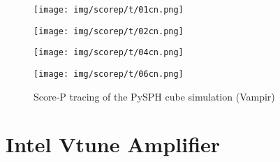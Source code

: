 \documentclass[a4paper,pagesize,12pt]{scrbook}
\begin{document}
\begin{figure}[ht]
\centering
\caption{Score-P tracing of the PySPH cube simulation (Vampir)}
\label{scorepTV}
\begin{minipage}[c]{\textwidth}
\captionsetup{labelformat=empty} \centering
    \texttt{[image: img/scorep/t/01cn.png]}
\end{minipage}
\noindent
\begin{minipage}[c]{\textwidth}
\captionsetup{labelformat=empty} \centering
    \texttt{[image: img/scorep/t/02cn.png]}
\end{minipage}
\noindent
\begin{minipage}[c]{\textwidth}
\captionsetup{labelformat=empty} \centering
    \texttt{[image: img/scorep/t/04cn.png]}
\end{minipage}
\noindent
\begin{minipage}[c]{\textwidth}
\captionsetup{labelformat=empty} \centering
    \texttt{[image: img/scorep/t/06cn.png]}
\end{minipage}
\end{figure}





\newpage
\section{Intel Vtune Amplifier}
\end{document}
